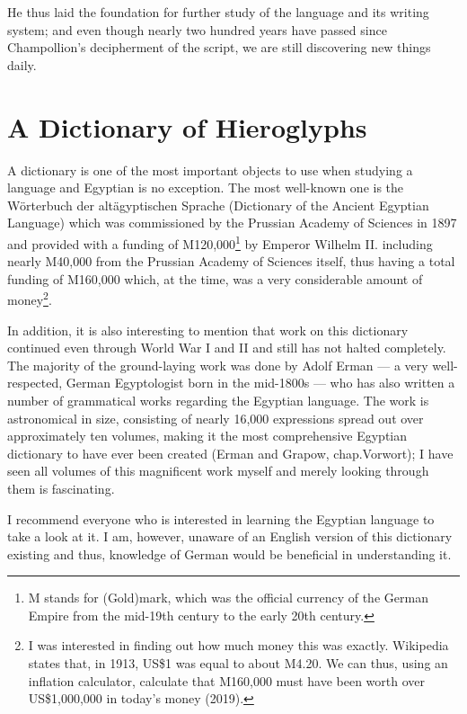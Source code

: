 \documentclass[a5paper,twoside,11pt]{report}
\begin{document}
	He thus laid the foundation for further study of the language and its writing system; and even though nearly two hundred years have passed since Champollion’s decipherment of the script, we are still discovering new things daily.

\chapter*{A Dictionary of Hieroglyphs}

  A dictionary is one of the most important objects to use when studying a language and Egyptian is no exception. The most well-known one is the Wörterbuch der altägyptischen Sprache (Dictionary of the Ancient Egyptian Language) which was commissioned by the Prussian Academy of Sciences in 1897 and provided with a funding of M120,000\footnote{M stands for (Gold)mark, which was the official currency of the German Empire from the mid-19th century to the early 20th century.} by Emperor Wilhelm II. including nearly M40,000 from the Prussian Academy of Sciences itself, thus having a total funding of M160,000 which, at the time, was a very considerable amount of money\footnote{I was interested in finding out how much money this was exactly. Wikipedia states that, in 1913, US\$1 was equal to about M4.20. We can thus, using an inflation calculator, calculate that M160,000 must have been worth over US\$1,000,000 in today’s money (2019).}.

	In addition, it is also interesting to mention that work on this dictionary continued even through World War I and II and still has not halted completely. The majority of the ground-laying work was done by Adolf Erman — a very well-respected, German Egyptologist born in the mid-1800s — who has also written a number of grammatical works regarding the Egyptian language. The work is astronomical in size, consisting of nearly 16,000 expressions spread out over approximately ten volumes, making it the most comprehensive Egyptian dictionary to have ever been created (Erman and Grapow, chap.Vorwort); I have seen all volumes of this magnificent work myself and merely looking through them is fascinating.

	I recommend everyone who is interested in learning the Egyptian language to take a look at it. I am, however, unaware of an English version of this dictionary existing and thus, knowledge of German would be beneficial in understanding it.
\end{document}
